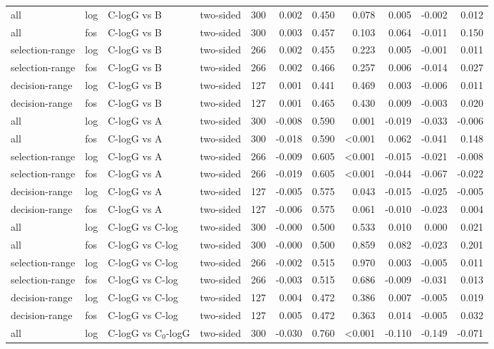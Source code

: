 \begin{longtable}{llllrrrrrrr}
all & log & C-logG vs B & two-sided & 300 & 0.002 & 0.450 & 0.078 & 0.005 & -0.002 & 0.012 \\
all & fos & C-logG vs B & two-sided & 300 & 0.003 & 0.457 & 0.103 & 0.064 & -0.011 & 0.150 \\
selection-range & log & C-logG vs B & two-sided & 266 & 0.002 & 0.455 & 0.223 & 0.005 & -0.001 & 0.011 \\
selection-range & fos & C-logG vs B & two-sided & 266 & 0.002 & 0.466 & 0.257 & 0.006 & -0.014 & 0.027 \\
decision-range & log & C-logG vs B & two-sided & 127 & 0.001 & 0.441 & 0.469 & 0.003 & -0.006 & 0.011 \\
decision-range & fos & C-logG vs B & two-sided & 127 & 0.001 & 0.465 & 0.430 & 0.009 & -0.003 & 0.020 \\
all & log & C-logG vs A & two-sided & 300 & -0.008 & 0.590 & 0.001 & -0.019 & -0.033 & -0.006 \\
all & fos & C-logG vs A & two-sided & 300 & -0.018 & 0.590 & <0.001 & 0.062 & -0.041 & 0.148 \\
selection-range & log & C-logG vs A & two-sided & 266 & -0.009 & 0.605 & <0.001 & -0.015 & -0.021 & -0.008 \\
selection-range & fos & C-logG vs A & two-sided & 266 & -0.019 & 0.605 & <0.001 & -0.044 & -0.067 & -0.022 \\
decision-range & log & C-logG vs A & two-sided & 127 & -0.005 & 0.575 & 0.043 & -0.015 & -0.025 & -0.005 \\
decision-range & fos & C-logG vs A & two-sided & 127 & -0.006 & 0.575 & 0.061 & -0.010 & -0.023 & 0.004 \\
all & log & C-logG vs C-log & two-sided & 300 & -0.000 & 0.500 & 0.533 & 0.010 & 0.000 & 0.021 \\
all & fos & C-logG vs C-log & two-sided & 300 & -0.000 & 0.500 & 0.859 & 0.082 & -0.023 & 0.201 \\
selection-range & log & C-logG vs C-log & two-sided & 266 & -0.002 & 0.515 & 0.970 & 0.003 & -0.005 & 0.011 \\
selection-range & fos & C-logG vs C-log & two-sided & 266 & -0.003 & 0.515 & 0.686 & -0.009 & -0.031 & 0.013 \\
decision-range & log & C-logG vs C-log & two-sided & 127 & 0.004 & 0.472 & 0.386 & 0.007 & -0.005 & 0.019 \\
decision-range & fos & C-logG vs C-log & two-sided & 127 & 0.005 & 0.472 & 0.363 & 0.014 & -0.005 & 0.032 \\
all & log & C-logG vs C$_0$-logG & two-sided & 300 & -0.030 & 0.760 & <0.001 & -0.110 & -0.149 & -0.071 \\

\end{longtable}
